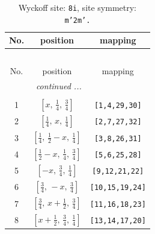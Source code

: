 \documentclass[fleqn,8pt]{jsarticle}
\begin{document}
\begin{longtable}{ccc}
\caption{Wyckoff site: {\tt 8i}, site symmetry: {\tt m'2m'.}}
 \\
 \hline \hline
No. & position & mapping \\ \hline \endfirsthead

\multicolumn{2}{l}{\tablename\ \thetable{}} \\
 \hline \hline
No. & position & mapping \\ \hline \endhead

 \hline \hline
\multicolumn{2}{r}{\footnotesize\it continued ...} \\ \endfoot

 \hline \hline
\multicolumn{2}{r}{} \\ \endlastfoot

1 & $\left[ x,\, \frac{1}{4},\, \frac{3}{4} \right]$ & {\tt [1,4,29,30]} \\ \hline
2 & $\left[ \frac{1}{4},\, x,\, \frac{1}{4} \right]$ & {\tt [2,7,27,32]} \\ \hline
3 & $\left[ \frac{1}{4},\, \frac{1}{2} - x,\, \frac{1}{4} \right]$ & {\tt [3,8,26,31]} \\ \hline
4 & $\left[ \frac{1}{2} - x,\, \frac{1}{4},\, \frac{3}{4} \right]$ & {\tt [5,6,25,28]} \\ \hline
5 & $\left[ - x,\, \frac{3}{4},\, \frac{1}{4} \right]$ & {\tt [9,12,21,22]} \\ \hline
6 & $\left[ \frac{3}{4},\, - x,\, \frac{3}{4} \right]$ & {\tt [10,15,19,24]} \\ \hline
7 & $\left[ \frac{3}{4},\, x + \frac{1}{2},\, \frac{3}{4} \right]$ & {\tt [11,16,18,23]} \\ \hline
8 & $\left[ x + \frac{1}{2},\, \frac{3}{4},\, \frac{1}{4} \right]$ & {\tt [13,14,17,20]} \\
\end{longtable}
\renewcommand{\arraystretch}{1.2}
\end{document}
